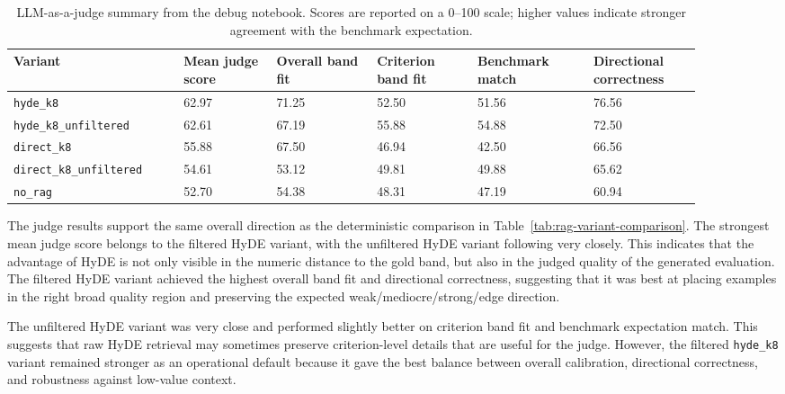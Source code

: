 \begin{table}[H]
    \centering
    \scriptsize
    \setlength{\tabcolsep}{3pt}
    \begin{tabular}{L{0.22\linewidth}L{0.12\linewidth}L{0.13\linewidth}L{0.13\linewidth}L{0.15\linewidth}L{0.14\linewidth}}
        \toprule
        Variant & Mean judge score & Overall band fit & Criterion band fit & Benchmark match & Directional correctness \\
        \midrule
        \texttt{hyde\_k8} & 62.97 & 71.25 & 52.50 & 51.56 & 76.56 \\
        \texttt{hyde\_k8\_unfiltered} & 62.61 & 67.19 & 55.88 & 54.88 & 72.50 \\
        \texttt{direct\_k8} & 55.88 & 67.50 & 46.94 & 42.50 & 66.56 \\
        \texttt{direct\_k8\_unfiltered} & 54.61 & 53.12 & 49.81 & 49.88 & 65.62 \\
        \texttt{no\_rag} & 52.70 & 54.38 & 48.31 & 47.19 & 60.94 \\
        \bottomrule
    \end{tabular}
    \caption{LLM-as-a-judge summary from the debug notebook. Scores are
    reported on a 0--100 scale; higher values indicate stronger agreement with
    the benchmark expectation.}
    \label{tab:llm-judge-comparison}
\end{table}

The judge results support the same overall direction as the deterministic
comparison in Table~\ref{tab:rag-variant-comparison}. The strongest mean judge
score belongs to the filtered HyDE variant, with the unfiltered HyDE variant
following very closely. This indicates that the advantage of HyDE is not only
visible in the numeric distance to the gold band, but also in the judged quality
of the generated evaluation. The filtered HyDE variant achieved the highest
overall band fit and directional correctness, suggesting that it was best at
placing examples in the right broad quality region and preserving the expected
weak/mediocre/strong/edge direction.

The unfiltered HyDE variant was very close and performed slightly better on
criterion band fit and benchmark expectation match. This suggests that raw HyDE
retrieval may sometimes preserve criterion-level details that are useful for
the judge. However, the filtered \texttt{hyde\_k8} variant remained stronger as
an operational default because it gave the best balance between overall
calibration, directional correctness, and robustness against low-value context.

